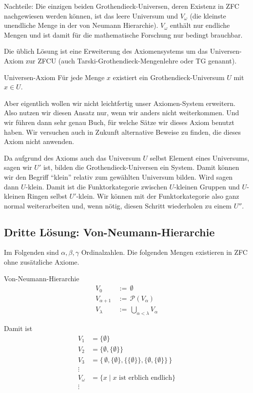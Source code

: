 \documentclass[a4paper]{amsart}
\theoremstyle{definition}
\newcommand{\PP}{\ensuremath{\mathcal{ P }}}
\begin{document}
Nachteile: Die einzigen beiden Grothendieck-Universen, deren Existenz in ZFC nachgewiesen werden können, ist das leere Universum und $V_\omega$ (die kleinste unendliche Menge in der von Neumann Hierarchie). $V_\omega$ enthält nur endliche Mengen und ist damit für die mathematische Forschung nur bedingt brauchbar.

Die üblich Lösung ist eine Erweiterung des Axiomensystems um das Universen-Axiom zur ZFCU (auch Tarski-Grothendieck-Mengenlehre oder TG genannt).

\begin{Definition}{Universen-Axiom}
   Für jede Menge $x$ existiert ein Grothendieck-Universum $U$ mit $x \in U$. 
\end{Definition}

Aber eigentlich wollen wir nicht leichtfertig unser Axiomen-System erweitern. Also nutzen wir diesen Ansatz nur, wenn wir anders nicht weiterkommen. Und wir führen dann sehr genau Buch, für welche Sätze wir dieses Axiom benutzt haben. Wir versuchen auch in Zukunft alternative Beweise zu finden, die dieses Axiom nicht anwenden.

Da aufgrund des Axioms auch das Universum $U$ selbst Element eines Universums, sagen wir $U'$ ist, bilden die Grothendieck-Universen ein System. Damit können wir den Begriff "`klein"' relativ zum gewählten Universum bilden. Wird sagen dann $U$-klein. Damit ist die Funktorkategorie zwischen $U$-kleinen Gruppen und $U$-kleinen Ringen selbst $U'$-klein. Wir können mit der Funktorkategorie also ganz normal weiterarbeiten und, wenn nötig, diesen Schritt wiederholen zu einem $U''$.

\subsection{Dritte Lösung: Von-Neumann-Hierarchie}
Im Folgenden sind $\alpha, \beta, \gamma$ Ordinalzahlen. Die folgenden Mengen existieren in ZFC ohne zusätzliche Axiome.
\begin{Definition}{Von-Neumann-Hierarchie}
   \begin{align}
      V_0\, & :=\, \emptyset \\
      V_{\alpha + 1}\, & :=\, \PP\left(V_\alpha\right) \\
      V_\lambda\, & :=\, \bigcup_{\alpha <\lambda}V_\alpha
   \end{align}
\end{Definition}
Damit ist
\begin{align}
   V_1 &= \{\emptyset \} \\
   V_2 &= \{\emptyset,\{\emptyset\}\} \\
   V_3 &= \{\,\emptyset, \{\emptyset\}, \{\{\emptyset\}\}, \{\emptyset,\{\emptyset\}\}\,\} \\
   \vdots \\
   V_\omega &= \{ x \mid x \text{ ist erblich endlich} \} \\
   \vdots
\end{align}
\end{document}
